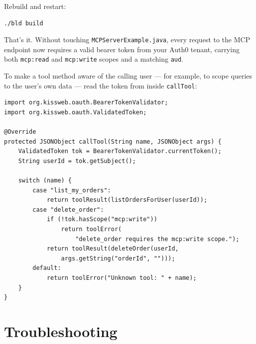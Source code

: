 \noindent
Rebuild and restart:

\begin{lstlisting}[style=shell]
./bld build
\end{lstlisting}

\noindent
That's it.  Without touching \texttt{MCPServer\-Example.java}, every request to the MCP endpoint now requires a valid bearer token from your Auth0 tenant, carrying both \texttt{mcp:read} and \texttt{mcp:write} scopes and a matching \texttt{aud}.

To make a tool method aware of the calling user --- for example, to scope queries to the user's own data --- read the token from inside \texttt{callTool}:

\begin{lstlisting}[style=java]
import org.kissweb.oauth.BearerTokenValidator;
import org.kissweb.oauth.ValidatedToken;

@Override
protected JSONObject callTool(String name, JSONObject args) {
    ValidatedToken tok = BearerTokenValidator.currentToken();
    String userId = tok.getSubject();

    switch (name) {
        case "list_my_orders":
            return toolResult(listOrdersForUser(userId));
        case "delete_order":
            if (!tok.hasScope("mcp:write"))
                return toolError(
                    "delete_order requires the mcp:write scope.");
            return toolResult(deleteOrder(userId,
                args.getString("orderId", "")));
        default:
            return toolError("Unknown tool: " + name);
    }
}
\end{lstlisting}

\section{Troubleshooting}
\label{sec:oauth-troubleshooting}

